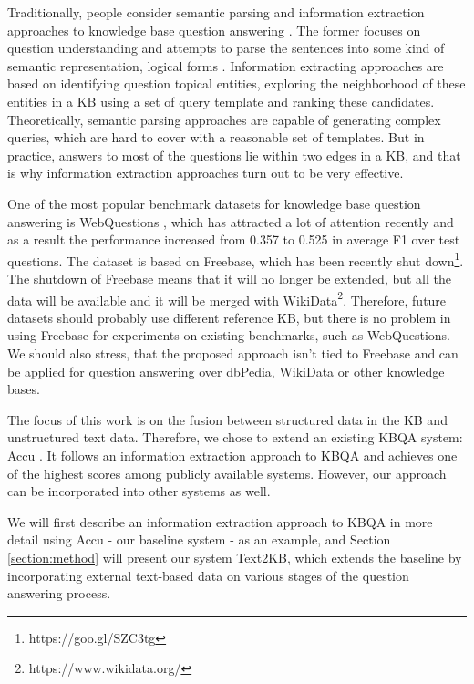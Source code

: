 Traditionally, people consider semantic parsing and information extraction approaches to knowledge base question answering \cite{yao2014freebase}.
The former focuses on question understanding and attempts to parse the sentences into some kind of semantic representation, \eg logical forms \cite{Berant:EMNLP13,berant2014semantic,berant2015imitation}.
Information extracting approaches \cite{ACCU:2015,yih2015semantic,yao2014information} are based on identifying question topical entities, exploring the neighborhood of these entities in a KB using a set of query template and ranking these candidates.
Theoretically, semantic parsing approaches are capable of generating complex queries, which are hard to cover with a reasonable set of templates.
But in practice, answers to most of the questions lie within two edges in a KB, and that is why information extraction approaches turn out to be very effective.

One of the most popular benchmark datasets for knowledge base question answering is WebQuestions \cite{Berant:EMNLP13}, which has attracted a lot of attention recently and as a result the performance increased from 0.357 \cite{Berant:EMNLP13} to 0.525 \cite{yih2015semantic} in average F1 over test questions.
The dataset is based on Freebase, which has been recently shut down\footnote{https://goo.gl/SZC3tg}.
The shutdown of Freebase means that it will no longer be extended, but all the data will be available and it will be merged with WikiData\footnote{https://www.wikidata.org/}.
Therefore, future datasets should probably use different reference KB, but there is no problem in using Freebase for experiments on existing benchmarks, such as WebQuestions.
We should also stress, that the proposed approach isn't tied to Freebase and can be applied for question answering over dbPedia, WikiData or other knowledge bases.

The focus of this work is on the fusion between structured data in the KB and unstructured text data.
Therefore, we chose to extend an existing KBQA system: Accu \cite{ACCU:2015}.
It follows an information extraction approach to KBQA and achieves one of the highest scores among publicly available systems.
However, our approach can be incorporated into other systems as well.

We will first describe an information extraction approach to KBQA in more detail using Accu - our baseline system - as an example, and Section \ref{section:method} will present our system Text2KB, which extends the baseline by incorporating external text-based data on various stages of the question answering process.

